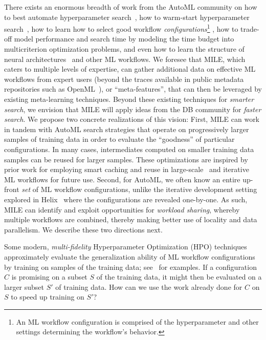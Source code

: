\documentclass[11pt,dvipdfmx]{article}
\newcommand{\topic}[1]{\vspace{-3.5pt}\smallskip \smallskip \noindent{\bf #1.}}
\newcommand{\system}{{\sf MILE}\xspace}
\begin{document}
There exists an enormous breadth
of work from the AutoML community on how to best automate hyperparameter
search~\cite{bergstra2011algorithms,bergstra2012random,golovin2017google}, 
how to warm-start hyperparameter search~\cite{feurer2014using,fusi2018probabilistic,gomes2012combining},
how to learn how to select good workflow
{\em configurations}\footnote{An ML workflow configuration is comprised of the hyperparameter and other settings determining the workflow's behavior.}
\cite{brazdil2003ranking,todorovski2002ranking},
how to trade-off model performance and search time by modeling the time
budget into multicriterion optimization problems, and even how to learn the structure
of neural architectures~\cite{pham2018efficient,zoph2016neural} and other ML workflows.
We foresee that \system, which
caters to multiple levels of expertise,
can gather additional data on effective ML workflows from expert users
(beyond the traces available in public metadata repositories such as
OpenML~\cite{OpenML2013}),
or ``meta-features'', that can then be leveraged by existing meta-learning techniques.
Beyond these existing techniques for {\em smarter search}, we envision that \system will apply
ideas from the DB community for {\em faster search}.
We propose two concrete realizations of this vision:
First, \system can work in tandem with
AutoML search strategies
that operate on progressively larger samples of training data in order to evaluate the
``goodness'' of particular configurations.
In many cases, intermediates computed on smaller training data samples can be reused for larger samples.
These optimizations are inspired by prior work
for employing smart caching and reuse in large-scale~\cite{Sparks:EECS-2016-200} and
iterative~\cite{xin2018helix,Shin2015} ML workflows for future use.
Second, for AutoML,
we often know an entire up-front {\em set} of ML workflow configurations,
unlike the iterative development setting explored in Helix~\cite{xin2018helix}
where the configurations are
revealed one-by-one. As such,
\system can identify and exploit opportunities
for {\em workload sharing}, whereby multiple workflows are combined, thereby making better use of locality and data parallelism.
We describe these two directions next.

\topic{Progressive Intermediate Reuse}
\label{sec:progreuse}
Some modern, {\em multi-fidelity} Hyperparameter Optimization (HPO) techniques
approximately evaluate the generalization ability of ML workflow configurations by
training on samples of the training data; see~\cite{huang2018efficient,kohavi1995automatic,provost1999efficient}
for examples. If a configuration $C$ is promising on a subset $S$ of the training
data, it might then be evaluated on a larger subset $S'$ of training data.
How can we use the work already done for $C$ on $S$ to speed up training on $S'$?
\end{document}
